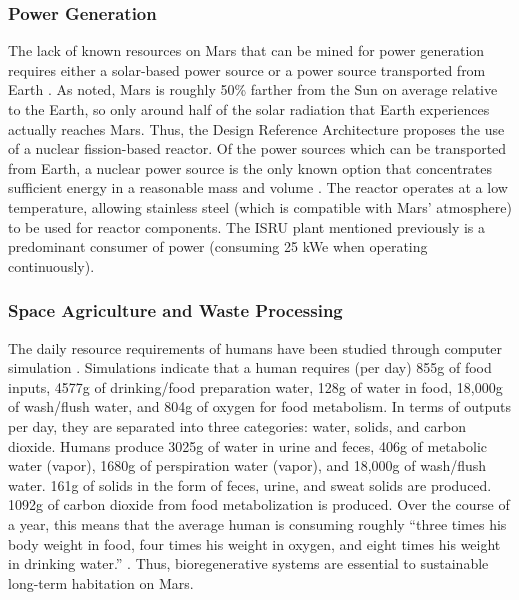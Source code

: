 \documentclass[12pt]{article}
\begin{document}
\subsubsection{Power Generation}

The lack of known resources on Mars that can be mined for power generation
requires either a solar-based power source or a power source transported from
Earth \cite{hoffman1997human}. As noted, Mars is roughly 50\% farther from the
Sun on average relative to the Earth, so only around half of the solar
radiation that Earth experiences actually reaches Mars. Thus, the Design
Reference Architecture \cite{drake2010human} proposes the use of a nuclear
fission-based reactor. Of the power sources which can be transported from
Earth, a nuclear power source is the only known option that concentrates
sufficient energy in a reasonable mass and volume \cite{hoffman1997human}.
The reactor operates at a low temperature, allowing stainless steel (which is
compatible with Mars' atmosphere) to be used for reactor components. The ISRU
plant mentioned previously is a predominant consumer of power (consuming 25 kWe
when operating continuously).

\subsubsection{Space Agriculture and Waste Processing}

The daily resource requirements of humans have been studied through computer
simulation \cite{rummel1987modular}. Simulations indicate that a human requires
(per day) 855g of food inputs, 4577g of drinking/food preparation water, 128g
of water in food, 18,000g of wash/flush water, and 804g of oxygen for food
metabolism. In terms of outputs per day, they are separated into three
categories: water, solids, and carbon dioxide. Humans produce 3025g of water
in urine and feces, 406g of metabolic water (vapor), 1680g of perspiration
water (vapor), and 18,000g of wash/flush water. 161g of solids in the form of
feces, urine, and sweat solids are produced. 1092g of carbon dioxide from
food metabolization is produced. Over the course of a year, this means that
the average human is consuming roughly ``three times his body weight in food,
four times his weight in oxygen, and eight times his weight in drinking water.''
\cite{modell1980rationale}. Thus, bioregenerative systems are essential to
sustainable long-term habitation on Mars.
\end{document}

